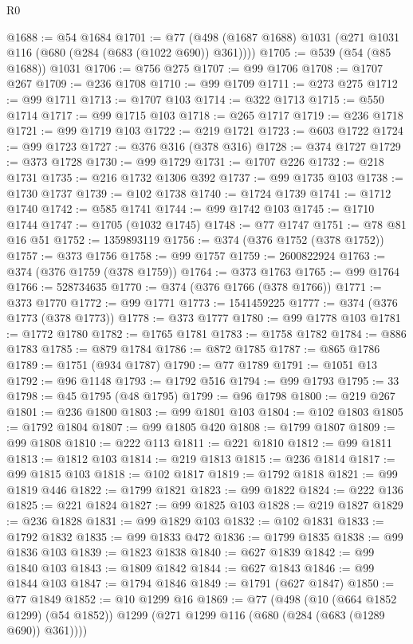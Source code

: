 \begin{lexlean}{R0}
\begin{coremodule}
@1688 := @54 @1684
@1701 := @77 (@498 (@1687 @1688) @1031 (@271 @1031 @116 (@680 (@284 (@683 (@1022 @690)) @361))))
@1705 := @539 (@54 (@85 @1688)) @1031
@1706 := @756 @275
@1707 := @99 @1706
@1708 := @1707 @267
@1709 := @236 @1708
@1710 := @99 @1709
@1711 := @273 @275
@1712 := @99 @1711
@1713 := @1707 @103
@1714 := @322 @1713
@1715 := @550 @1714
@1717 := @99 @1715 @103
@1718 := @265 @1717
@1719 := @236 @1718
@1721 := @99 @1719 @103
@1722 := @219 @1721
@1723 := @603 @1722
@1724 := @99 @1723
@1727 := @376 @316 (@378 @316)
@1728 := @374 @1727
@1729 := @373 @1728
@1730 := @99 @1729
@1731 := @1707 @226
@1732 := @218 @1731
@1735 := @216 @1732 @1306 @392
@1737 := @99 @1735 @103
@1738 := @1730 @1737
@1739 := @102 @1738
@1740 := @1724 @1739
@1741 := @1712 @1740
@1742 := @585 @1741
@1744 := @99 @1742 @103
@1745 := @1710 @1744
@1747 := @1705 (@1032 @1745)
@1748 := @77 @1747
@1751 := @78 @81 @16 @51
@1752 := 1359893119
@1756 := @374 (@376 @1752 (@378 @1752))
@1757 := @373 @1756
@1758 := @99 @1757
@1759 := 2600822924
@1763 := @374 (@376 @1759 (@378 @1759))
@1764 := @373 @1763
@1765 := @99 @1764
@1766 := 528734635
@1770 := @374 (@376 @1766 (@378 @1766))
@1771 := @373 @1770
@1772 := @99 @1771
@1773 := 1541459225
@1777 := @374 (@376 @1773 (@378 @1773))
@1778 := @373 @1777
@1780 := @99 @1778 @103
@1781 := @1772 @1780
@1782 := @1765 @1781
@1783 := @1758 @1782
@1784 := @886 @1783
@1785 := @879 @1784
@1786 := @872 @1785
@1787 := @865 @1786
@1789 := @1751 (@934 @1787)
@1790 := @77 @1789
@1791 := @1051 @13
@1792 := @96 @1148
@1793 := @1792 @516
@1794 := @99 @1793
@1795 := 33
@1798 := @45 @1795 (@48 @1795)
@1799 := @96 @1798
@1800 := @219 @267
@1801 := @236 @1800
@1803 := @99 @1801 @103
@1804 := @102 @1803
@1805 := @1792 @1804
@1807 := @99 @1805 @420
@1808 := @1799 @1807
@1809 := @99 @1808
@1810 := @222 @113
@1811 := @221 @1810
@1812 := @99 @1811
@1813 := @1812 @103
@1814 := @219 @1813
@1815 := @236 @1814
@1817 := @99 @1815 @103
@1818 := @102 @1817
@1819 := @1792 @1818
@1821 := @99 @1819 @446
@1822 := @1799 @1821
@1823 := @99 @1822
@1824 := @222 @136
@1825 := @221 @1824
@1827 := @99 @1825 @103
@1828 := @219 @1827
@1829 := @236 @1828
@1831 := @99 @1829 @103
@1832 := @102 @1831
@1833 := @1792 @1832
@1835 := @99 @1833 @472
@1836 := @1799 @1835
@1838 := @99 @1836 @103
@1839 := @1823 @1838
@1840 := @627 @1839
@1842 := @99 @1840 @103
@1843 := @1809 @1842
@1844 := @627 @1843
@1846 := @99 @1844 @103
@1847 := @1794 @1846
@1849 := @1791 (@627 @1847)
@1850 := @77 @1849
@1852 := @10 @1299 @16
@1869 := @77
    (@498
      (@10 (@664 @1852 @1299) (@54 @1852))
      @1299
      (@271 @1299 @116 (@680 (@284 (@683 (@1289 @690)) @361))))

\end{coremodule}
\end{lexlean}
